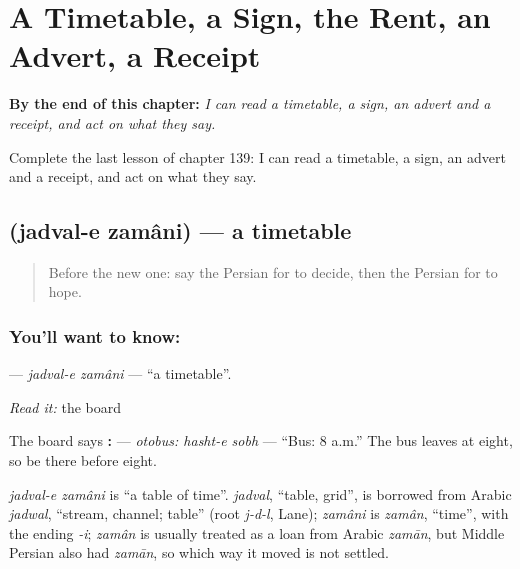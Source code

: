 
\chapter{A Timetable, a Sign, the Rent, an Advert, a Receipt}
\label{ch:fa-a-timetable-a-sign-the-rent-an-advert-a-receipt}

\begin{chapteropening}
\textbf{By the end of this chapter:} \emph{I can read a timetable, a sign, an advert and a receipt, and act on what they say.}

Complete the last lesson of chapter 139: I can read a timetable, a sign, an advert and a receipt, and act on what they say.
\end{chapteropening}

\section[\texorpdfstring{\fa{جدول} \fa{زمانی} (jadval-e zamâni)}{جدول زمانی (jadval-e zamâni)}]{  (jadval-e zamâni) — a timetable}

\label{lesson:FA-C139-jadval-e-zamani}



\begin{quote}
Before the new one: say the Persian for to decide, then the Persian for to hope.
\end{quote}

\subsection*{You'll want to know:  }
\textbf{ } — \emph{jadval-e zamâni} — \textquotedblleft{}a timetable\textquotedblright{}.

\emph{Read it:} the board

The board says \textbf{:  } — \emph{otobus: hasht-e sobh} — \textquotedblleft{}Bus: 8 a.m.\textquotedblright{} The bus leaves at eight, so be there before eight.

\begin{cousinweb}
\emph{jadval-e zamâni} is \textquotedblleft{}a table of time\textquotedblright{}. \emph{jadval}, \textquotedblleft{}table, grid\textquotedblright{}, is borrowed from Arabic \emph{jadwal}, \textquotedblleft{}stream, channel; table\textquotedblright{} (root \emph{j-d-l}, Lane); \emph{zamâni} is \emph{zamân}, \textquotedblleft{}time\textquotedblright{}, with the ending \emph{-i}; \emph{zamân} is usually treated as a loan from Arabic \emph{zamān}, but Middle Persian also had \emph{zamān}, so which way it moved is not settled.
\end{cousinweb}


